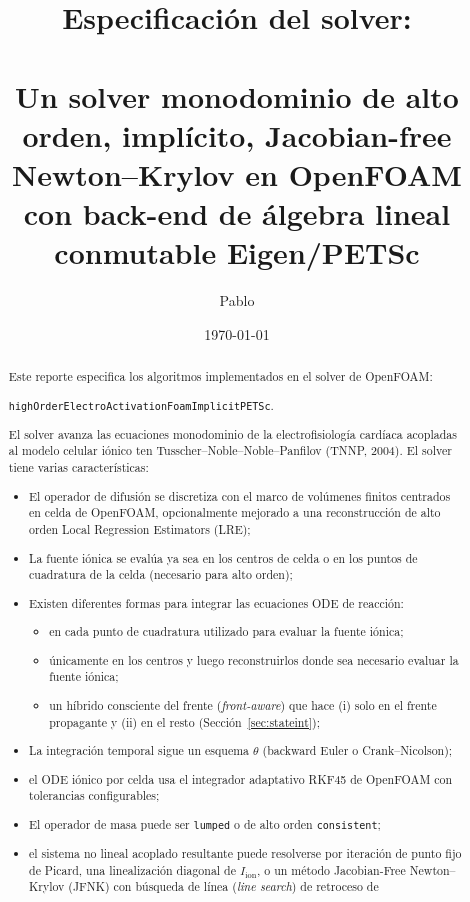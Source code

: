 \documentclass[11pt,a4paper]{article}
\title{Especificación del solver:\\
       \texorpdfstring{\code{highOrderElectroActivationFoamImplicitPETSc}}{highOrderElectroActivationFoamImplicitPETSc}\\
       \large Un solver monodominio de alto orden, implícito, Jacobian-free
       Newton--Krylov en OpenFOAM con back-end de álgebra lineal conmutable
       Eigen/PETSc}
\author{Pablo}
\date{\today}
\newcommand{\code}[1]{\texttt{\small #1}}
\newcommand{\Iion}{I_{\mathrm{ion}}}
\begin{document}
\maketitle

\begin{abstract}
Este reporte especifica los algoritmos implementados en el solver de OpenFOAM:

\begin{center}
\code{highOrderElectroActivationFoamImplicitPETSc}.
\end{center}

El solver avanza las ecuaciones
monodominio de la electrofisiología cardíaca acopladas al modelo celular iónico
ten Tusscher--Noble--Noble--Panfilov (TNNP, 2004). El solver tiene varias características:
\begin{itemize}
\item El operador de difusión se
discretiza con el marco de volúmenes finitos centrados en celda de OpenFOAM,
opcionalmente mejorado a una reconstrucción de alto orden Local
Regression Estimators (LRE);
\item La fuente iónica se evalúa ya sea en los centros de
celda o en los puntos de cuadratura de la celda (necesario para alto orden);
\item Existen diferentes formas para integrar las ecuaciones ODE de reacción:
\begin{itemize}
\item[(i)] en cada punto de cuadratura utilizado para evaluar la fuente iónica;
\item[(ii)] únicamente en los centros y luego reconstruirlos donde sea necesario evaluar la fuente iónica;
\item[(iii)] un híbrido consciente del frente (\emph{front-aware}) que hace (i) solo en el frente propagante y (ii) en el resto (Sección~\ref{sec:stateint});
\end{itemize}
\item La integración temporal sigue un esquema $\theta$ (backward Euler o Crank--Nicolson);
\item el ODE iónico
por celda usa el integrador adaptativo RKF45 de OpenFOAM con tolerancias
configurables;
\item El operador de masa puede ser \code{lumped} o de alto orden \code{consistent};
\item el sistema no lineal acoplado resultante puede resolverse por iteración de punto
fijo de Picard, una linealización diagonal de $\Iion$, o un método Jacobian-Free
Newton--Krylov (JFNK) con búsqueda de línea (\emph{line search}) de retroceso de

\end{itemize}
\end{abstract}
\end{document}
